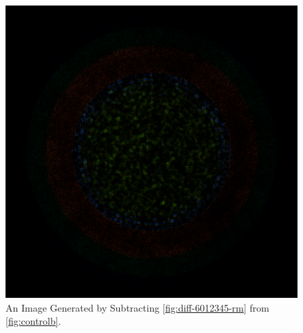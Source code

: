 \begin{figure}[H]
\centering
\includegraphics[width=0.6\linewidth]{figures/shuffle/diff-6012345}
\caption{An Image Generated by Subtracting \ref{fig:diff-6012345-rm} from \ref{fig:controlb}.}
\label{fig:diff-6012345}
\end{figure}